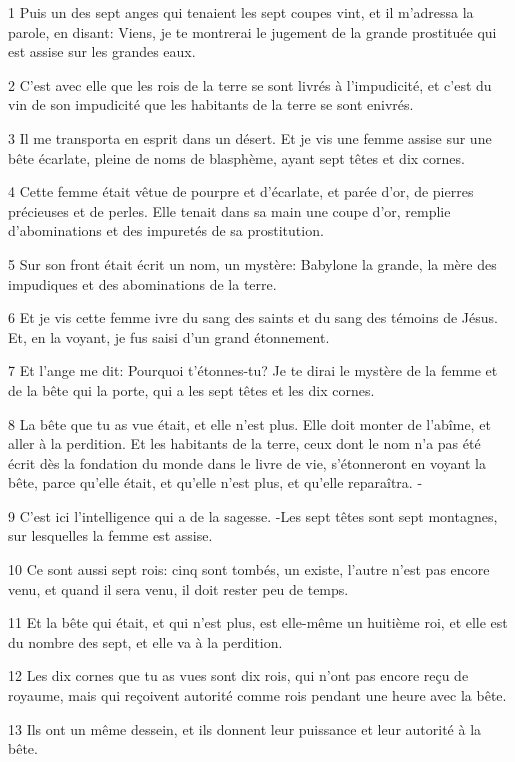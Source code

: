\par 1 Puis un des sept anges qui tenaient les sept coupes vint, et il m'adressa la parole, en disant: Viens, je te montrerai le jugement de la grande prostituée qui est assise sur les grandes eaux.
\par 2 C'est avec elle que les rois de la terre se sont livrés à l'impudicité, et c'est du vin de son impudicité que les habitants de la terre se sont enivrés.
\par 3 Il me transporta en esprit dans un désert. Et je vis une femme assise sur une bête écarlate, pleine de noms de blasphème, ayant sept têtes et dix cornes.
\par 4 Cette femme était vêtue de pourpre et d'écarlate, et parée d'or, de pierres précieuses et de perles. Elle tenait dans sa main une coupe d'or, remplie d'abominations et des impuretés de sa prostitution.
\par 5 Sur son front était écrit un nom, un mystère: Babylone la grande, la mère des impudiques et des abominations de la terre.
\par 6 Et je vis cette femme ivre du sang des saints et du sang des témoins de Jésus. Et, en la voyant, je fus saisi d'un grand étonnement.
\par 7 Et l'ange me dit: Pourquoi t'étonnes-tu? Je te dirai le mystère de la femme et de la bête qui la porte, qui a les sept têtes et les dix cornes.
\par 8 La bête que tu as vue était, et elle n'est plus. Elle doit monter de l'abîme, et aller à la perdition. Et les habitants de la terre, ceux dont le nom n'a pas été écrit dès la fondation du monde dans le livre de vie, s'étonneront en voyant la bête, parce qu'elle était, et qu'elle n'est plus, et qu'elle reparaîtra. -
\par 9 C'est ici l'intelligence qui a de la sagesse. -Les sept têtes sont sept montagnes, sur lesquelles la femme est assise.
\par 10 Ce sont aussi sept rois: cinq sont tombés, un existe, l'autre n'est pas encore venu, et quand il sera venu, il doit rester peu de temps.
\par 11 Et la bête qui était, et qui n'est plus, est elle-même un huitième roi, et elle est du nombre des sept, et elle va à la perdition.
\par 12 Les dix cornes que tu as vues sont dix rois, qui n'ont pas encore reçu de royaume, mais qui reçoivent autorité comme rois pendant une heure avec la bête.
\par 13 Ils ont un même dessein, et ils donnent leur puissance et leur autorité à la bête.
